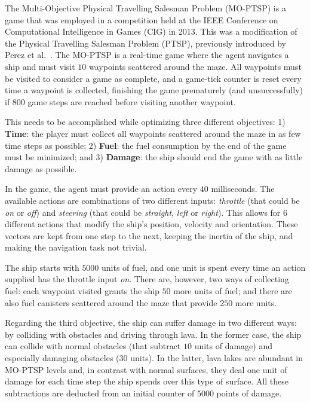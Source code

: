 \documentclass[journal]{IEEEtran}
\begin{document}
The Multi-Objective Physical Travelling Salesman Problem (MO-PTSP) is a game that was employed in a competition held at the IEEE Conference on Computational Intelligence in Games (CIG) in 2013. This was a modification of the Physical Travelling Salesman Problem (PTSP), previously introduced by Perez et al.~\cite{PerezCEC2012}. The MO-PTSP is a real-time game where the agent navigates a ship and must visit $10$ waypoints scattered around the maze. All waypoints must be visited to consider a game as complete, and a game-tick counter is reset every time a waypoint is collected, finishing the game prematurely (and unsuccessfully) if $800$ game steps are reached before visiting another waypoint.

This needs to be accomplished while optimizing three different objectives:  1) \textbf{Time}: the player must collect all waypoints scattered around the maze in as few time steps as possible; 2) \textbf{Fuel}: the fuel consumption by the end of the game must be minimized; and 3) \textbf{Damage}: the ship should end the game with as little damage as possible.

In the game, the agent must provide an action every $40$ milliseconds. The available actions are combinations of two different inputs: \textit{throttle} (that could be \textit{on} or \textit{off}) and \textit{steering} (that could be \textit{straight}, \textit{left} or \textit{right}). This allows for $6$ different actions that modify the ship's position, velocity and orientation. These vectors are kept from one step to the next, keeping the inertia of the ship, and making the navigation task not trivial. 

The ship starts with $5000$ units of fuel, and one unit is spent every time an action supplied has the throttle input \textit{on}. There are, however, two ways of collecting fuel: each waypoint visited grants the ship $50$ more units of fuel; and there are also fuel canisters scattered around the maze that provide $250$ more units.

Regarding the third objective, the ship can suffer damage in two different ways: by colliding with obstacles and driving through lava. In the former case, the ship can collide with normal obstacles (that subtract $10$ units of damage) and especially damaging obstacles ($30$ units). In the latter, lava lakes are abundant in MO-PTSP levels and, in contrast with normal surfaces, they deal one unit of damage for each time step the ship spends over this type of surface. All these subtractions are deducted from an initial counter of $5000$ points of damage.
\end{document}

